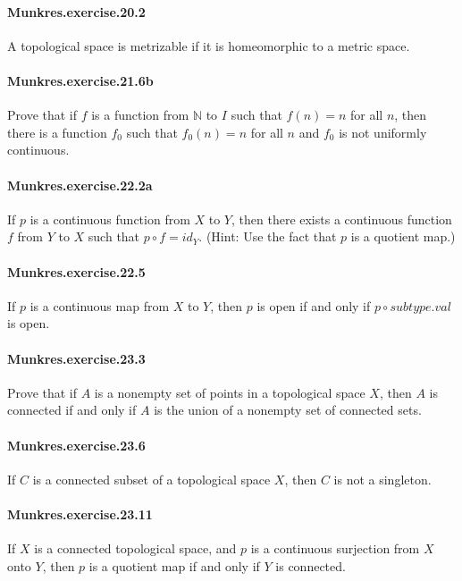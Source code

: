\documentclass{article}
\begin{document}
\paragraph{Munkres.exercise.20.2} A topological space is metrizable if it is homeomorphic to a metric space.

\paragraph{Munkres.exercise.21.6b} Prove that if $f$ is a function from $\mathbb{N}$ to $I$ such that $f(n) = n$ for all $n$, then there is a function $f_0$ such that $f_0(n) = n$ for all $n$ and $f_0$ is not uniformly continuous.

\paragraph{Munkres.exercise.22.2a} If $p$ is a continuous function from $X$ to $Y$, then there exists a continuous function $f$ from $Y$ to $X$ such that $p \circ f = id_Y$. (Hint: Use the fact that $p$ is a quotient map.)

\paragraph{Munkres.exercise.22.5} If $p$ is a continuous map from $X$ to $Y$, then $p$ is open if and only if $p ∘ subtype.val$ is open.

\paragraph{Munkres.exercise.23.3} Prove that if $A$ is a nonempty set of points in a topological space $X$, then $A$ is connected if and only if $A$ is the union of a nonempty set of connected sets.

\paragraph{Munkres.exercise.23.6} If $C$ is a connected subset of a topological space $X$, then $C$ is not a singleton.

\paragraph{Munkres.exercise.23.11} If $X$ is a connected topological space, and $p$ is a continuous surjection from $X$ onto $Y$, then $p$ is a quotient map if and only if $Y$ is connected.
\end{document}
